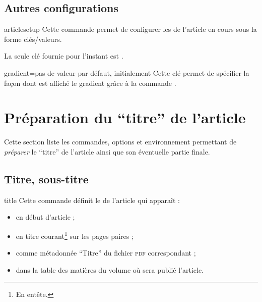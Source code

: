 \documentclass[french,nolocaltoc]{nwejmart}
\newtheorem[title=Fait,style=definition]{fact}
\begin{document}
\subsection{Autres configurations}
\label{sec:autr-conf}

\begin{docCommand}{articlesetup}{}
  Cette commande permet de configurer les  de l'article en cours
  sous la forme clés/valeurs.

  La seule clé fournie pour l'instant est .
  \begin{docKey}{gradient}{=\textbar{}}{pas
      de valeur par défaut, initialement }
    Cette clé permet de spécifier la façon dont est affiché le gradient grâce
    à la commande .
  \end{docKey}
\end{docCommand}


\section{Préparation du \enquote{titre} de l'article}
\label{sec-prep-de-lart}

Cette section liste les commandes, options et environnement permettant de
\emph{préparer} le \enquote{titre} de l'article ainsi que son éventuelle partie
finale.

\subsection{Titre, sous-titre}
\label{sec-titre}

\begin{docCommand}[doc description=\mandatory]{title}{}
  Cette commande définit le  de l'article qui apparaît :
  \begin{itemize}
  \item en début d'article ;
  \item en titre courant\footnote{En entête.} sur les pages paires ;
  \item comme métadonnée \enquote{Titre} du fichier \textsc{pdf} correspondant ;
  \item dans la table des matières du volume où sera publié l'article.
  \end{itemize}
\end{docCommand}
\end{document}

